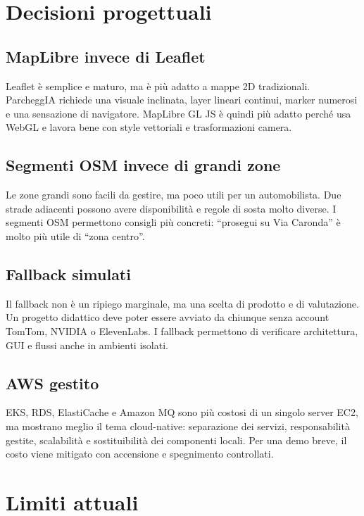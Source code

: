 \documentclass[11pt,a4paper]{article}
\begin{document}
\section{Decisioni progettuali}

\subsection{MapLibre invece di Leaflet}

Leaflet \`e semplice e maturo, ma \`e pi\`u adatto a mappe 2D tradizionali. ParcheggIA richiede una visuale inclinata, layer lineari continui, marker numerosi e una sensazione di navigatore. MapLibre GL JS \`e quindi pi\`u adatto perch\'e usa WebGL e lavora bene con style vettoriali e trasformazioni camera.

\subsection{Segmenti OSM invece di grandi zone}

Le zone grandi sono facili da gestire, ma poco utili per un automobilista. Due strade adiacenti possono avere disponibilit\`a e regole di sosta molto diverse. I segmenti OSM permettono consigli pi\`u concreti: ``prosegui su Via Caronda'' \`e molto pi\`u utile di ``zona centro''.

\subsection{Fallback simulati}

Il fallback non \`e un ripiego marginale, ma una scelta di prodotto e di valutazione. Un progetto didattico deve poter essere avviato da chiunque senza account TomTom, NVIDIA o ElevenLabs. I fallback permettono di verificare architettura, GUI e flussi anche in ambienti isolati.

\subsection{AWS gestito}

EKS, RDS, ElastiCache e Amazon MQ sono pi\`u costosi di un singolo server EC2, ma mostrano meglio il tema cloud-native: separazione dei servizi, responsabilit\`a gestite, scalabilit\`a e sostituibilit\`a dei componenti locali. Per una demo breve, il costo viene mitigato con accensione e spegnimento controllati.

\section{Limiti attuali}
\end{document}
